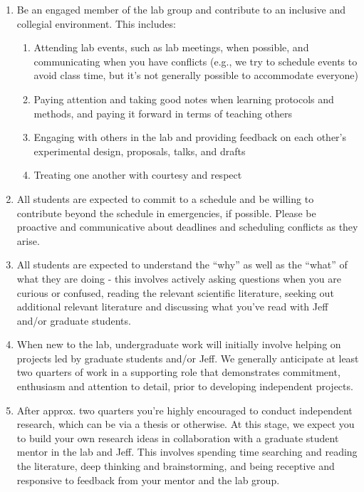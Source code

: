 \documentclass[12pt]{article}
\begin{document}
\begin{enumerate}
\item Be an engaged member of the lab group and contribute to an inclusive and collegial environment. This includes:
\begin{enumerate}
\item Attending lab events, such as lab meetings, when possible, and communicating when you have conflicts (e.g., we try to schedule events to avoid class time, but it's not generally possible to accommodate everyone)
\item Paying attention and taking good notes when learning protocols and methods, and paying it forward in terms of teaching others 
\item Engaging with others in the lab and providing feedback on each other's experimental design, proposals, talks, and drafts
\item Treating one another with courtesy and respect
\end{enumerate}

\item All students are expected to commit to a schedule and be willing to contribute beyond the schedule in emergencies, if possible.
Please be proactive and communicative about deadlines and scheduling conflicts as they arise.

\item All students are expected to understand the ``why'' as well as the ``what'' of what they are doing - this involves actively asking questions when you are curious or confused, reading the relevant scientific literature, seeking out additional relevant literature and discussing what you've read with Jeff and/or graduate students.

\item When new to the lab, undergraduate work will initially involve helping on projects led by graduate students and/or Jeff. We generally anticipate at least two quarters of work in a supporting role that demonstrates commitment, enthusiasm and attention to detail, prior to developing independent projects. 

\item After approx. two quarters you're highly encouraged to conduct independent research, which can be via a thesis or otherwise. At this stage, we expect you to build your own research ideas in collaboration with a graduate student mentor in the lab and Jeff. This involves spending time searching and reading the literature, deep thinking and brainstorming, and being receptive and responsive to feedback from your mentor and the lab group.


\end{enumerate}
\end{document}
